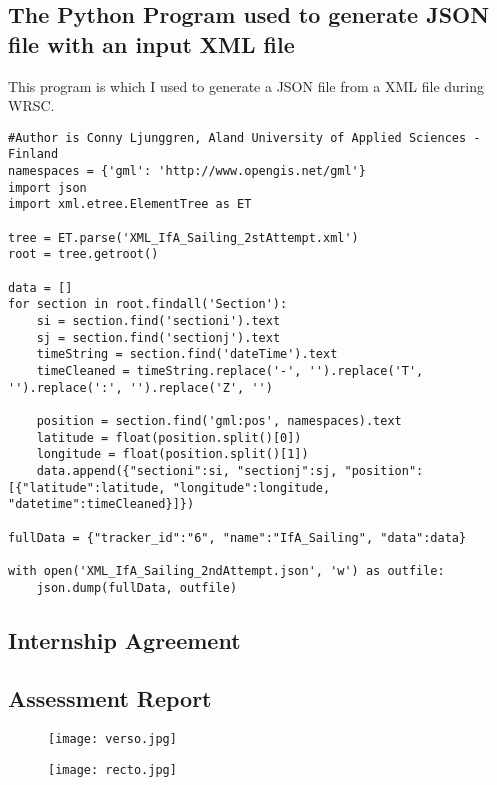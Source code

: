 \subsection{The Python Program used to generate JSON file with an input XML file}
This program is which I used to generate a JSON file from a XML file during WRSC.
\begin{lstlisting}
#Author is Conny Ljunggren, Aland University of Applied Sciences - Finland
namespaces = {'gml': 'http://www.opengis.net/gml'}
import json
import xml.etree.ElementTree as ET

tree = ET.parse('XML_IfA_Sailing_2stAttempt.xml')
root = tree.getroot()

data = []
for section in root.findall('Section'):
	si = section.find('sectioni').text
	sj = section.find('sectionj').text
	timeString = section.find('dateTime').text
	timeCleaned = timeString.replace('-', '').replace('T', '').replace(':', '').replace('Z', '')
	
	position = section.find('gml:pos', namespaces).text
	latitude = float(position.split()[0])
	longitude = float(position.split()[1])
	data.append({"sectioni":si, "sectionj":sj, "position":[{"latitude":latitude, "longitude":longitude, "datetime":timeCleaned}]})

fullData = {"tracker_id":"6", "name":"IfA_Sailing", "data":data}

with open('XML_IfA_Sailing_2ndAttempt.json', 'w') as outfile:
    json.dump(fullData, outfile)
\end{lstlisting}
\subsection{Internship Agreement}



\subsection{Assessment Report}
\begin{figure}[h!]
    \centering
    \texttt{[image: verso.jpg]}
    \label{fig-sample}
\end{figure}
\begin{figure}[h!]
    \centering
    \texttt{[image: recto.jpg]}
    \label{fig-sample}
\end{figure}